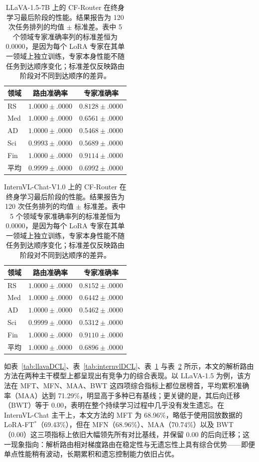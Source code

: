 \begin{table}[!htbp]
\centering
\caption{LLaVA-1.5-7B 上的 CF-Router 在终身学习最后阶段的性能。结果报告为 120 次任务排列的均值 $\pm$ 标准差。表中 5 个领域专家准确率列的标准差恒为 0.0000，是因为每个 LoRA 专家在其单一领域上独立训练，专家本身性能不随任务到达顺序变化；标准差仅反映路由阶段对不同到达顺序的差异。}
\label{tab:llava_router}
\begin{tabular}{lcc}
\toprule
领域 & 路由准确率 & 专家准确率 \\
\midrule
RS      & $1.0000 \pm .0000$ & $0.8128 \pm .0000$ \\
Med     & $1.0000 \pm .0000$ & $0.6561 \pm .0000$ \\
AD      & $1.0000 \pm .0000$ & $0.5468 \pm .0000$ \\
Sci     & $0.9993 \pm .0000$ & $0.5689 \pm .0000$ \\
Fin     & $1.0000 \pm .0000$ & $0.9114 \pm .0000$ \\
\midrule
平均 & $0.9999 \pm .0000$ & $0.6992 \pm .0000$ \\
\bottomrule
\end{tabular}
\end{table}

\begin{table}[!htbp]
\centering
\caption{InternVL-Chat-V1.0 上的 CF-Router 在终身学习最后阶段的性能。结果报告为 120 次任务排列的均值 $\pm$ 标准差。表中 5 个领域专家准确率列的标准差恒为 0.0000，是因为每个 LoRA 专家在其单一领域上独立训练，专家本身性能不随任务到达顺序变化；标准差仅反映路由阶段对不同到达顺序的差异。}
\label{tab:internvl_router}
\begin{tabular}{lcc}
\toprule
领域 & 路由准确率 & 专家准确率 \\
\midrule
RS      & $1.0000 \pm .0000$ & $0.8152 \pm .0000$ \\
Med     & $1.0000 \pm .0000$ & $0.6442 \pm .0000$ \\
AD      & $1.0000 \pm .0000$ & $0.5462 \pm .0000$ \\
Sci     & $0.9999 \pm .0000$ & $0.5312 \pm .0000$ \\
Fin     & $1.0000 \pm .0000$ & $0.9110 \pm .0000$ \\
\midrule
平均 & $1.0000 \pm .0000$ & $0.6896 \pm .0000$ \\
\bottomrule
\end{tabular}
\end{table}

如表~\ref{tab:llavaDCL}、表~\ref{tab:internvlDCL}、表~\ref{tab:llava_router} 与表~\ref{tab:internvl_router} 所示，本文的解析路由方法在两种主干模型上都呈现出有竞争力的综合表现。以 LLaVA-1.5 为例，该方法在 MFT、MFN、MAA、BWT 这四项综合指标上都位居榜首，平均累积准确率（MAA）达到 71.29\%，明显高于多种已有基线；更关键的是，其后向迁移（BWT）等于 0.00，表明在整个持续学习过程中几乎没有发生遗忘。在 InternVL-Chat 主干上，本文方法的 MFT 为 68.96\%，略低于使用回放数据的 LoRA-FT$^*$（69.43\%），但在 MFN（68.96\%）、MAA（70.74\%）以及 BWT（0.00）这三项指标上依旧大幅领先所有对比基线，并保留 0.00 的后向迁移；这一现象指向：解析路由相对梯度路由在稳定性与无遗忘性上具有综合优势——即便单点性能稍有波动，长期累积和遗忘控制能力依旧占优。

